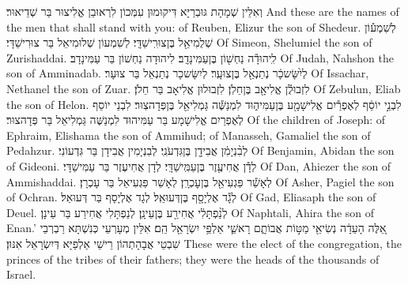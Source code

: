 {וְאִלֵּין שְׁמָהָת גּוּבְרַיָּא דִּיקוּמוּן עִמְּכוֹן לִרְאוּבֵן אֱלִיצוּר בַּר שְׁדֵיאוּר׃}
{And these are the names of the men that shall stand with you: of Reuben, Elizur the son of Shedeur.}{}
{לְשִׁמְע֕וֹן שְׁלֻמִיאֵ֖ל בֶּן\maqqaf צוּרִֽישַׁדָּֽי׃}
{לְשִׁמְעוֹן שְׁלוּמִיאֵל בַּר צוּרִישַׁדָּי׃}
{Of Simeon, Shelumiel the son of Zurishaddai.}{}
{לִֽיהוּדָ֕ה נַחְשׁ֖וֹן בֶּן\maqqaf עַמִּינָדָֽב׃}
{לִיהוּדָה נַחְשׁוֹן בַּר עַמִּינָדָב׃}
{Of Judah, Nahshon the son of Amminadab.}{}
{לְיִ֨שָּׂשכָ֔ר נְתַנְאֵ֖ל בֶּן\maqqaf צוּעָֽר׃}
{לְיִשָּׂשכָר נְתַנְאֵל בַּר צוּעָר׃}
{Of Issachar, Nethanel the son of Zuar.}{}
{לִזְבוּלֻ֕ן אֱלִיאָ֖ב בֶּן\maqqaf חֵלֹֽן׃}
{לִזְבוּלוּן אֱלִיאָב בַּר חֵלֹן׃}
{Of Zebulun, Eliab the son of Helon.}{}
{לִבְנֵ֣י יוֹסֵ֔ף לְאֶפְרַ֕יִם אֱלִישָׁמָ֖ע בֶּן\maqqaf עַמִּיה֑וּד לִמְנַשֶּׁ֕ה גַּמְלִיאֵ֖ל בֶּן\maqqaf פְּדָהצֽוּר׃}
{לִבְנֵי יוֹסֵף לְאֶפְרַיִם אֱלִישָׁמָע בַּר עַמִּיהוּד לִמְנַשֶּׁה גַּמְלִיאֵל בַּר פְּדָהצוּר׃}
{Of the children of Joseph: of Ephraim, Elishama the son of Ammihud; of Manasseh, Gamaliel the son of Pedahzur.}{}
{לְבִ֨נְיָמִ֔ן אֲבִידָ֖ן בֶּן\maqqaf גִּדְעֹנִֽי׃}
{לְבִנְיָמִין אֲבִידָן בַּר גִּדְעוֹנִי׃}
{Of Benjamin, Abidan the son of Gideoni.}{}
{לְדָ֕ן אֲחִיעֶ֖זֶר בֶּן\maqqaf עַמִּֽישַׁדָּֽי׃}
{לְדָן אֲחִיעֶזֶר בַּר עַמִּישַׁדָּי׃}
{Of Dan, Ahiezer the son of Ammishaddai.}{}
{לְאָשֵׁ֕ר פַּגְעִיאֵ֖ל בֶּן\maqqaf עׇכְרָֽן׃}
{לְאָשֵׁר פַּגְעִיאֵל בַּר עָכְרָן׃}
{Of Asher, Pagiel the son of Ochran.}{}
{לְגָ֕ד אֶלְיָסָ֖ף בֶּן\maqqaf דְּעוּאֵֽל׃}
{לְגָד אֶלְיָסָף בַּר דְּעוּאֵל׃}
{Of Gad, Eliasaph the son of Deuel.}{}
{לְנַ֨פְתָּלִ֔י אֲחִירַ֖ע בֶּן\maqqaf עֵינָֽן׃}
{לְנַפְתָּלִי אֲחִירַע בַּר עֵינָן׃}
{Of Naphtali, Ahira the son of Enan.’}{}
{אֵ֚לֶּה  הָעֵדָ֔ה נְשִׂיאֵ֖י מַטּ֣וֹת אֲבוֹתָ֑ם רָאשֵׁ֛י אַלְפֵ֥י יִשְׂרָאֵ֖ל הֵֽם׃}
{אִלֵּין מְעָרְעֵי כְּנִשְׁתָּא רַבְרְבֵי שִׁבְטֵי אֲבָהָתְהוֹן רֵישֵׁי אַלְפַיָּא דְּיִשְׂרָאֵל אִנּוּן׃}
{These were the elect of the congregation, the princes of the tribes of their fathers; they were the heads of the thousands of Israel.}{}
